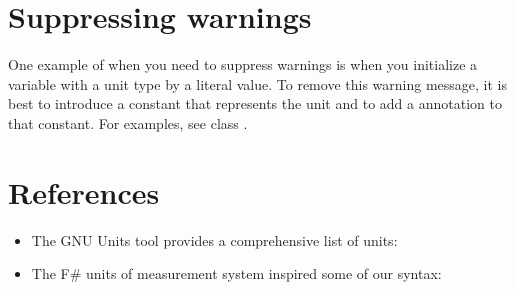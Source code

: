 \section{Suppressing warnings\label{units-suppressing}}

One example of when you need to suppress warnings is when you
initialize a variable with a unit type by a literal value.
To remove this warning message, it is best to introduce a
constant that represents the unit and to
add a 
annotation to that constant.
For examples, see class .


\section{References\label{units-references}}

\begin{itemize}
\item The GNU Units tool provides a comprehensive list of units:\\

\item The F\# units of measurement system inspired some of our syntax:\\

\end{itemize}

